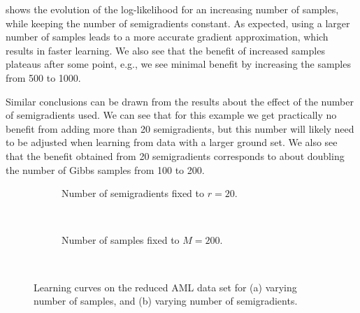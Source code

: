  shows the evolution of the log-likelihood for an increasing number of samples, while keeping the number of semigradients constant.
As expected, using a larger number of samples leads to a more accurate gradient approximation, which results in faster learning.
We also see that the benefit of increased samples plateaus after some point, e.g., we see minimal benefit by increasing the samples from 500 to 1000.

Similar conclusions can be drawn from the results  about the effect of the number of semigradients used.
We can see that for this example we get practically no benefit from adding more than 20 semigradients, but this number will likely need to be adjusted when learning from data with a larger ground set.
We also see that the benefit obtained from 20 semigradients corresponds to about doubling the number of Gibbs samples from 100 to 200.

\setlength{}
\setlength{}
\renewcommand{\subflen}{\textwidth}
\begin{figure}[htbp]
  \centering
  \begin{subfigure}[b]{\subflen}
    \centering
    
    \caption{Number of semigradients fixed to $r = 20$.}
    \label{fig:syn_nsamples}
  \end{subfigure}\\[2em]
  \begin{subfigure}[b]{\subflen}
    \centering
    
    \caption{Number of samples fixed to $M = 200$.}
    \label{fig:syn_nsubg}
  \end{subfigure}\\[1em]
  \caption{
    Learning curves on the reduced AML data set for (a) varying number of samples, and (b) varying number of semigradients.
  }
  \label{fig:syn1}
\end{figure}

